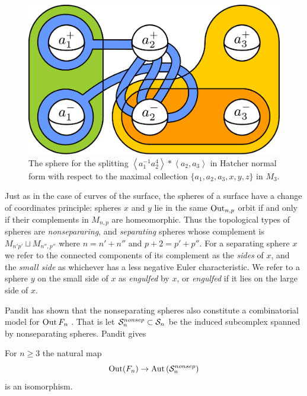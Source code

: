 \begin{figure}[h!]
  \centering
  \includegraphics[width=.6\textwidth]{figures/normalform.pdf}
  \caption{
   The sphere for the splitting $\left \langle a_1^{-1}a_2^4 \right \rangle \ast \left \langle a_2,a_3 \right \rangle$ in Hatcher normal form with respect to the maximal collection $\{a_1,a_2,a_3,x,y,z\}$ in $M_3$.
  }
  \label{fig:normalform}
\end{figure}

Just as in the case of curves of the surface,
the spheres of a surface have a
{change of coordinates principle}:
spheres $x$ and $y$ lie in the same $\operatorname{Out}_{n,p}$ orbit if
and only if their complements in $M_{n,p}$ are homeomorphic.
Thus the topological types of spheres are
\emph{nonsepararing}, and \emph{separating} spheres whose complement is $M_{n'p'} \sqcup M_{n'',p''}$
where
$n=n'+n''$ and $p+2=p'+p''$.
For a separating sphere $x$
we refer to the connected components of its complement as the \emph{sides}
of $x$, and the \emph{small side} as whichever has a less negative Euler characteristic.
We refer to a sphere $y$ on the small side of $x$ as \emph{engulfed} by $x$,
or \emph{engulfed} if it lies on the large side of $x$.

Pandit has shown that the nonseparating spheres
also constitute a combinatorial model for $\operatorname{Out} F_n$ \cite{pandit}.
That is let ${ \mathcal S^{{nonsep}}_n }  \subset \mathcal S_n$ be the induced subcomplex spanned by nonseparating spheres. Pandit gives
\begin{theorem}
  For $n \geq 3$ the natural map
  $${ \operatorname{Out}(F_n)} \to  \operatorname{Aut} \left ({ \mathcal S^{{nonsep}}_n } \right ) $$
  is an isomorphism.
\end{theorem}
